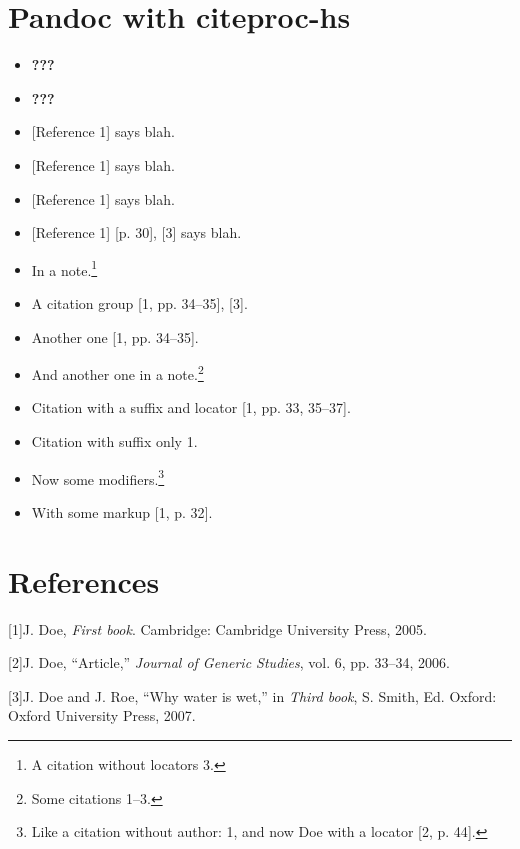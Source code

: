 \documentclass[twocolumn]{article}
\date{}
\begin{document}
\section{Pandoc with citeproc-hs}\label{pandoc-with-citeproc-hs}

\begin{itemize}
\item
  \textbf{???}
\item
  \textbf{???}
\item
  {[}Reference 1{]} says blah.
\item
  {[}Reference 1{]} says blah.
\item
  {[}Reference 1{]} says blah.
\item
  {[}Reference 1{]} {[}p. 30{]}, {[}3{]} says blah.
\item
  In a note.\footnote{A citation without locators 3.}
\item
  A citation group {[}1, pp. 34--35{]}, {[}3{]}.
\item
  Another one {[}1, pp. 34--35{]}.
\item
  And another one in a note.\footnote{Some citations 1--3.}
\item
  Citation with a suffix and locator {[}1, pp. 33, 35--37{]}.
\item
  Citation with suffix only 1.
\item
  Now some modifiers.\footnote{Like a citation without author: 1, and
    now Doe with a locator {[}2, p. 44{]}.}
\item
  With some markup {[}1, p. 32{]}.
\end{itemize}

\section*{References}\label{references}

{[}1{]}J. Doe, \emph{First book}. Cambridge: Cambridge University Press,
2005.

{[}2{]}J. Doe, ``Article,'' \emph{Journal of Generic Studies}, vol. 6,
pp. 33--34, 2006.

{[}3{]}J. Doe and J. Roe, ``Why water is wet,'' in \emph{Third book}, S.
Smith, Ed. Oxford: Oxford University Press, 2007.
\end{document}

